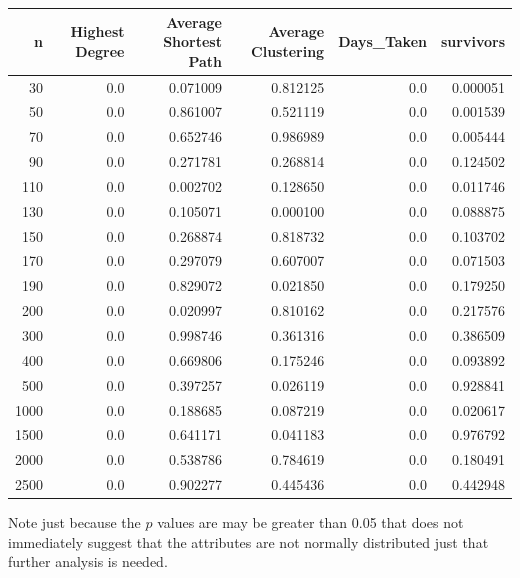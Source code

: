\documentclass{article}
\begin{document}
            \begin{tabular}{rrrrrr}
                \toprule
                   n &  Highest Degree &  Average Shortest Path &  Average Clustering &  Days\_Taken &  survivors \\
                \midrule
                  30 &             0.0 &               0.071009 &            0.812125 &         0.0 &   0.000051 \\
                  50 &             0.0 &               0.861007 &            0.521119 &         0.0 &   0.001539 \\
                  70 &             0.0 &               0.652746 &            0.986989 &         0.0 &   0.005444 \\
                  90 &             0.0 &               0.271781 &            0.268814 &         0.0 &   0.124502 \\
                 110 &             0.0 &               0.002702 &            0.128650 &         0.0 &   0.011746 \\
                 130 &             0.0 &               0.105071 &            0.000100 &         0.0 &   0.088875 \\
                 150 &             0.0 &               0.268874 &            0.818732 &         0.0 &   0.103702 \\
                 170 &             0.0 &               0.297079 &            0.607007 &         0.0 &   0.071503 \\
                 190 &             0.0 &               0.829072 &            0.021850 &         0.0 &   0.179250 \\
                 200 &             0.0 &               0.020997 &            0.810162 &         0.0 &   0.217576 \\
                 300 &             0.0 &               0.998746 &            0.361316 &         0.0 &   0.386509 \\
                 400 &             0.0 &               0.669806 &            0.175246 &         0.0 &   0.093892 \\
                 500 &             0.0 &               0.397257 &            0.026119 &         0.0 &   0.928841 \\
                1000 &             0.0 &               0.188685 &            0.087219 &         0.0 &   0.020617 \\
                1500 &             0.0 &               0.641171 &            0.041183 &         0.0 &   0.976792 \\
                2000 &             0.0 &               0.538786 &            0.784619 &         0.0 &   0.180491 \\
                2500 &             0.0 &               0.902277 &            0.445436 &         0.0 &   0.442948 \\
                \bottomrule
                \end{tabular}
            Note just because the $p$ values are may be greater than 0.05 that does not immediately suggest that the attributes are not normally distributed just that further analysis is needed.
\end{document}
